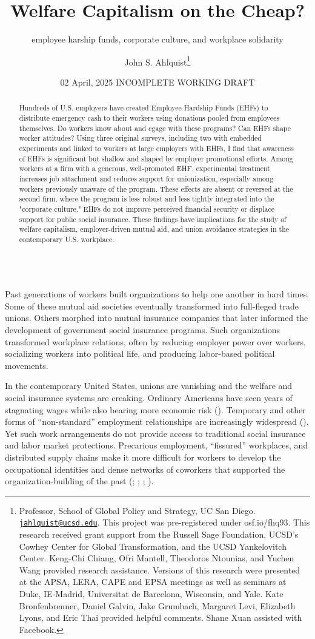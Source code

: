 \documentclass[
  11pt,
  oneside]{article}
\title{Welfare Capitalism on the Cheap?}
\subtitle{employee harship funds, corporate culture, and workplace solidarity}
\author{John S. Ahlquist\footnote{Professor, School of Global Policy and Strategy, UC San Diego. \href{mailto:jahlquist@ucsd.edu}{\nolinkurl{jahlquist@ucsd.edu}}. This project was pre-registered under osf.io/fhq93. This research received grant support from the Russell Sage Foundation, UCSD's Cowhey Center for Global Transformation, and the UCSD Yankelovitch Center. Keng-Chi Chiang, Ofri Mantell, Theodoros Ntounias, and Yuchen Wang provided research assistance. Versions of this research were presented at the APSA, LERA, CAPE and EPSA meetings as well as seminars at Duke, IE-Madrid, Universitat de Barcelona, Wisconsin, and Yale. Kate Bronfenbrenner, Daniel Galvin, Jake Grumbach, Margaret Levi, Elizabeth Lyons, and Eric Thai provided helpful comments. Shane Xuan assisted with Facebook.}}
\date{02 April, 2025 INCOMPLETE WORKING DRAFT}
\begin{document}
\maketitle

\begin{abstract}
\begin{singlespace} 

Hundreds of U.S. employers have created Employee Hardship Funds (EHFs) to distribute emergency cash to their workers using donations pooled from employees themselves. Do workers know about and egage with these programs? Can EHFs shape worker attitudes? Using three original surveys, including two with embedded experiments and linked to workers at large employers with EHFs, I find that awareness of EHFs is significant but shallow and shaped by employer promotional efforts. Among workers at a firm with a generous, well-promoted EHF, experimental treatment increases job attachment and reduces support for unionization, especially among workers previously unaware of the program. These effects are absent or reversed at the second firm, where the program is less robust and less tightly integrated into the "corporate culture." EHFs do not improve perceived financial security or displace support for public social insurance. These findings have implications for the study of welfare capitalism, employer-driven mutual aid, and union avoidance strategies in the contemporary U.S. workplace.\\
\\


\end{singlespace}
\end{abstract}

Past generations of workers built organizations to help one another in hard times. Some of these mutual aid societies eventually transformed into full-fleged trade unions. Others morphed into mutual insurance companies that later informed the development of government social insurance programs. Such organizations transformed workplace relations, often by reducing employer power over workers, socializing workers into political life, and producing labor-based political movements.

In the contemporary United States, unions are vanishing and the welfare and social insurance systems are creaking. Ordinary Americans have seen years of stagnating wages while also bearing more economic risk (). Temporary and other forms of ``non-standard'' employment relationships are increasingly widespread (). Yet such work arrangements do not provide access to traditional social insurance and labor market protections. Precarious employment, ``fissured'' workplaces, and distributed supply chains make it more difficult for workers to develop the occupational identities and dense networks of coworkers that supported the organization-building of the past (; ; ; ).
\end{document}
